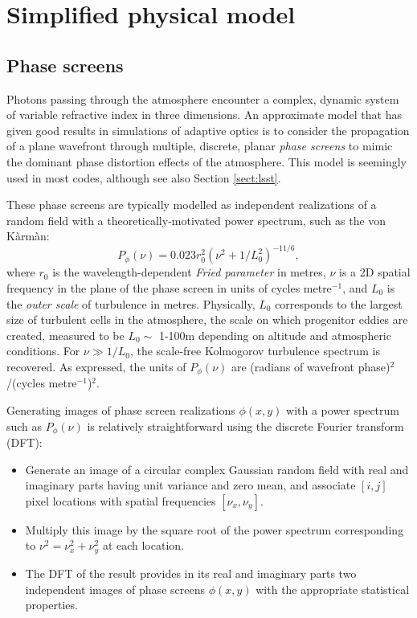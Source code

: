 \documentclass[preprint]{aastex}
\begin{document}
\section{Simplified physical model}
\subsection{Phase screens}\label{sect:phasescreens}
Photons passing through the atmosphere encounter a complex, dynamic
system of variable refractive index in three dimensions.  An
approximate model that has given good results in simulations of adaptive
optics is to consider the propagation of a plane wavefront through
multiple, discrete, planar \emph{phase screens} to mimic the dominant phase
distortion effects of the atmosphere. This model is seemingly used
in most codes, although see also Section \ref{sect:lsst}. 

These phase screens are
typically modelled as independent realizations of a random field with
a theoretically-motivated power spectrum, such as the von K\`{a}rm\`{a}n:
\begin{equation}\label{eq:ps}
P_{\phi}(\nu) = 0.023 r_0^2 \left(\nu^2 + 1/L_0^2\right)^{-11/6},
\end{equation}
where $r_0$ is the wavelength-dependent \emph{Fried parameter} in metres, $\nu$
is a 2D spatial frequency in the plane of the phase screen in units of cycles metre$^{-1}$, and $L_0$ is
the \emph{outer scale} of turbulence in metres.  Physically, $L_0$
corresponds to the largest size of turbulent cells in the atmosphere,
the scale on which progenitor eddies are created, measured to be $L_0
\sim$ 1-100m depending on altitude and atmospheric conditions.  For
$\nu \gg 1/L_0$, the scale-free Kolmogorov turbulence spectrum is recovered.  As
expressed, the units of $P_{\phi}(\nu)$ are (radians of
wavefront phase)$^2$/(cycles metre$^{-1}$)$^2$.

Generating images of phase screen realizations $\phi(x, y)$ with a power spectrum such as
$P_{\phi}(\nu)$ is relatively straightforward using the discrete
Fourier transform (DFT):
\begin{itemize}
\item Generate an image of a circular complex Gaussian random field with real and imaginary
parts having unit variance and zero mean, and associate $[i, j]$ pixel
locations with spatial frequencies $[\nu_x, \nu_y]$.
\item Multiply this image by the square
root of the power spectrum corresponding to $\nu^2 = {\nu_x^2 + \nu_y^2}$ at each location.
\item The DFT of the result provides in its
real and imaginary parts two independent images of phase
screens $\phi(x, y)$ with the appropriate statistical properties.  
\end{itemize}
\end{document}
